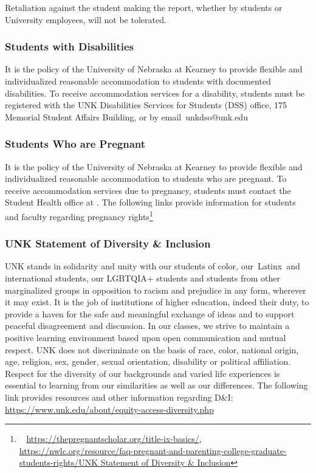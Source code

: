 \documentclass[12pt]{article}
\newcounter{ex}\setcounter{ex}{0}
\renewenvironment{description}[0]{\begin{compactdesc}}{\end{compactdesc}}
\begin{document}
{\begin{description}
    \item[Campus Police (or Security)]
    
    \item[Title IX Coordinator]

\end{description}
Retaliation against the student making the report, whether by students or University employees, will not be tolerated.

\subsubsection*{Students with Disabilities}

It is the policy of the University of Nebraska at Kearney to provide flexible and individualized reasonable accommodation to students with documented disabilities. To receive accommodation services for a disability, students must be registered with the UNK Disabilities Services for Students (DSS) office, 175 Memorial Student Affairs Building,   or by email unkdso@unk.edu  


\subsubsection*{Students Who are Pregnant}

It is the policy of the University of Nebraska at Kearney to provide flexible and individualized reasonable accommodation to students who are pregnant. To receive accommodation services due to pregnancy, students must contact the Student Health office at . The following links provide information for students and faculty regarding pregnancy rights\footnote{\small  \url{https://thepregnantscholar.org/title-ix-basics/}, \url{https://nwlc.org/resource/faq-pregnant-and-parenting-college-graduate-students-rights/UNK Statement of Diversity & Inclusion}}

\subsubsection*{UNK Statement of Diversity \& Inclusion}

UNK stands in solidarity and unity with our students of color, our Latinx and international students, our LGBTQIA+ students and students from other marginalized groups in opposition to racism and prejudice in any form, wherever it may exist. It is the job of institutions of higher education, indeed their duty, to provide a haven for the safe and meaningful exchange of ideas and to support peaceful disagreement and discussion. In our classes, we strive to maintain a positive learning environment based upon open communication and mutual respect. UNK does not discriminate on the basis of race, color, national origin, age, religion, sex, gender, sexual orientation, disability or political affiliation. Respect for the diversity of our backgrounds and varied life experiences is essential to learning from our similarities as well as our differences. The following link provides resources and other information regarding D\&I:  \url{https://www.unk.edu/about/equity-access-diversity.php}
\end{document}
